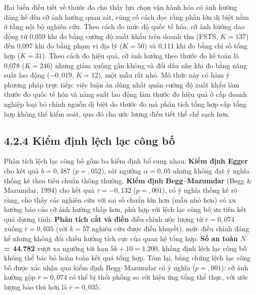 \documentclass[
  a4paper,
  13pt]{extreport}
\begin{document}
Hai biến điều tiết về thước đo cho thấy lựa chọn vận hành hóa có ảnh
hưởng đáng kể đến cỡ ảnh hưởng quan sát, củng cố cách đọc rằng phần lớn
dị biệt nằm ở tầng nội bộ nghiên cứu. Theo cách đo mức độ quốc tế hóa,
cỡ ảnh hưởng dao động từ 0,059 khi đo bằng cường độ xuất khẩu trên doanh
thu (FSTS, \(K = 137\)) đến 0,097 khi đo bằng phạm vi địa lý
(\(K = 50\)) và 0,111 khi đo bằng chỉ số tổng hợp (\(K = 31\)). Theo
cách đo hiệu quả, cỡ ảnh hưởng theo thước đo kế toán là 0,078
(\(K = 246\)) nhưng giảm xuống gần không và đổi dấu nhẹ khi đo bằng năng
suất lao động (\(-0{,}019\), \(K = 12\)), một mẫu rất nhỏ. Mô thức này
có hàm ý phương pháp trực tiếp: việc luận án dùng nhất quán cường độ
xuất khẩu làm thước đo quốc tế hóa và năng suất lao động làm thước đo
hiệu quả ở cấp doanh nghiệp loại bỏ chính nguồn dị biệt do thước đo mà
phân tích tổng hợp cấp tổng hợp không thể kiểm soát, qua đó cho ước
lượng điều tiết thể chế sạch hơn.

\hypertarget{kiux1ec3m-ux111ux1ecbnh-lux1ec7ch-lux1ea1c-cuxf4ng-bux1ed1}{%
\subsection{4.2.4 Kiểm định lệch lạc công
bố}\label{kiux1ec3m-ux111ux1ecbnh-lux1ec7ch-lux1ea1c-cuxf4ng-bux1ed1}}

Phân tích lệch lạc công bố gồm ba kiểm định bổ sung nhau. \textbf{Kiểm
định Egger} cho kết quả \(b = 0{,}487\) (\(p = {,}052\)), sát ngưỡng
\(\alpha = 0{,}05\) nhưng không đạt ý nghĩa thống kê theo tiêu chuẩn
thông thường. \textbf{Kiểm định Begg--Mazumdar} (Begg \& Mazumdar, 1994)
cho kết quả \(\tau = -0{,}132\) (\(p = {,}001\)), có ý nghĩa thống kê rõ
ràng, cho thấy các nghiên cứu với sai số chuẩn lớn hơn (mẫu nhỏ hơn) có
xu hướng báo cáo cỡ ảnh hưởng thấp hơn, phù hợp với lệch lạc công bố ưu
tiên kết quả dương tính. \textbf{Phân tích cắt và điền} điều chỉnh ước
lượng từ \(\bar{r} = 0{,}074\) xuống \(\bar{r} = 0{,}035\) (với
\(k = 57\) nghiên cứu được điền khuyết), mức điều chỉnh đáng kể nhưng
không đổi chiều hướng tích cực của quan hệ tổng hợp. \textbf{Số an toàn
\(N\) = 44.782} vượt xa ngưỡng tới hạn \(5k + 10 = 1.200\), khẳng định
lệch lạc công bố không thể bác bỏ hoàn toàn kết quả tổng hợp. Tóm lại,
bằng chứng lệch lạc công bố được xác nhận qua kiểm định Begg--Mazumdar
có ý nghĩa (\(p = {,}001\)): cỡ ảnh hưởng gộp \(\bar{r} = 0{,}074\) có
thể bị thổi phồng so với hiệu ứng tổng thể thực, với ước lượng bảo thủ
hơn là \(\bar{r} = 0{,}035\).
\end{document}
